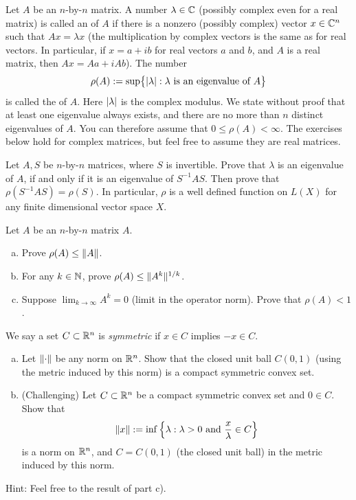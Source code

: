 \begin{exnote}
Let $A$ be an $n$-by-$n$ matrix.
A number $\lambda \in {\mathbb{C}}$ (possibly complex even for a real matrix)
is called an \emph{} of $A$
if there is a nonzero (possibly complex) vector $x \in {\mathbb{C}}^n$ such that $Ax = \lambda
x$ (the multiplication by complex vectors is the same as for real vectors.
In particular, if $x =
a+ib$ for real vectors $a$ and $b$, and $A$ is a real matrix, then $Ax = Aa + i Ab$).
The number
\begin{equation*}
\rho(A) :=
\sup \bigl\{ \left\lvert {\lambda} \right\rvert : \lambda \text{ is an eigenvalue of } A \bigr\}
\end{equation*}
is called the \emph{} of $A$.  Here $\left\lvert {\lambda} \right\rvert$ is the complex
modulus.  We state without proof that at least one eigenvalue always exists,
and there are no more than $n$ distinct eigenvalues of $A$.  You can
therefore assume that $0 \leq \rho(A) < \infty$.
The exercises below hold for complex matrices, but feel free to assume they
are real matrices.
\end{exnote}

\begin{exercise}
Let $A,S$ be $n$-by-$n$ matrices, where $S$ is invertible.
Prove that $\lambda$ is an eigenvalue of $A$, if and only
if it is an eigenvalue of $S^{-1}AS$.  Then prove that
$\rho(S^{-1}AS) = \rho(S)$.
In particular, $\rho$ is a well defined function on $L(X)$ for
any finite dimensional vector space $X$.
\end{exercise}

\begin{exercise}
Let $A$ be an $n$-by-$n$ matrix $A$.
\begin{enumerate}[a)]
\item
Prove $\rho(A) \leq \lVert {A} \rVert$.
\item
For any $k \in {\mathbb{N}}$, prove
$\rho(A) \leq \lVert {A^k} \rVert^{1/k}$.
\item
Suppose $\displaystyle \lim_{k\to\infty} A^k = 0$ (limit in the operator norm).
Prove that $\rho(A) < 1$.
\end{enumerate}
\end{exercise}

\begin{exercise}
We say a set $C \subset {\mathbb{R}}^n$ is \emph{symmetric} if
$x \in C$ implies $-x \in C$.
\begin{enumerate}[a)]
\item
Let $\lVert {\cdot} \rVert$ be any norm on ${\mathbb{R}}^n$.  Show that the closed unit ball
$C(0,1)$ (using the metric induced by this norm)
is a compact symmetric convex set.
\item (Challenging)
Let $C \subset {\mathbb{R}}^n$ be a compact symmetric convex set and $0 \in C$.  Show that
\begin{equation*}
\lVert {x} \rVert := \inf \left\{ \lambda : \lambda > 0 \text{ and } \frac{x}{\lambda} \in C \right\}
\end{equation*}
is a norm on ${\mathbb{R}}^n$, and $C = C(0,1)$ (the closed unit ball) in the metric induced by this norm.
\end{enumerate}
Hint: Feel free to the result of  part c).
\end{exercise}

